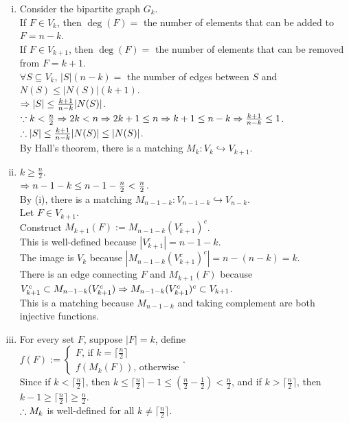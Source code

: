 \setcounter{pr}{1}

\begin{pr}$ $
\begin{enumerate}[(i)]
\item Consider the bipartite graph $G_k$.\\
If $F\in V_k$, then $\deg(F)=$ the number of elements that can be added to $F=n-k$.\\
If $F\in V_{k+1}$, then $\deg(F)=$ the number of elements that can be removed from $F=k+1$.\\
$\forall S\subseteq V_k$, $|S|(n-k)=$ the number of edges between $S$ and $N(S)\leq|N(S)|(k+1)$.\\
$\Rightarrow|S|\leq\frac{k+1}{n-k}|N(S)|$.\\
$\because k<\frac n2\Rightarrow2k<n\Rightarrow2k+1\leq n\Rightarrow k+1\leq n-k\Rightarrow\frac{k+1}{n-k}\leq1$.\\
$\therefore|S|\leq\frac{k+1}{n-k}|N(S)|\leq|N(S)|$.\\
By Hall's theorem, there is a matching $M_k: V_k\hookrightarrow V_{k+1}$.
\item $k\geq\frac n2$.\\
$\Rightarrow n-1-k\leq n-1-\frac n2<\frac n2$.\\
By (i), there is a matching $M_{n-1-k}: V_{n-1-k}\hookrightarrow V_{n-k}$.\\
Let $F\in V_{k+1}$.\\
Construct $M_{k+1}(F):=M_{n-1-k}(V_{k+1}^c)^c$.\\
This is well-defined because $|V_{k+1}^c|=n-1-k$.\\
The image is $V_k$ because $|M_{n-1-k}(V_{k+1}^c)^c|=n-(n-k)=k$.\\
There is an edge connecting $F$ and $M_{k+1}(F)$ because $V_{k+1}^c\subset M_{n-1-k}(V_{k+1}^c)\Rightarrow M_{n-1-k}(V_{k+1}^c)^c\subset V_{k+1}$.\\
This is a matching because $M_{n-1-k}$ and taking complement are both injective functions.
\item \newcommand{\half}{{\lceil\frac n2\rceil}}
For every set $F$, suppose $|F|=k$, define $f(F):=\begin{cases}
F\text{, if }k=\half\\
f(M_k(F))\text{, otherwise}
\end{cases}$.\\
Since if $k<\half$, then $k\leq\half-1\leq(\frac n2-\frac12)<\frac n2$, and if $k>\half$, then $k-1\geq\half\geq\frac n2$.\\
$\therefore M_k$ is well-defined for all $k\neq\half$.\\

\end{enumerate}
\end{pr}
